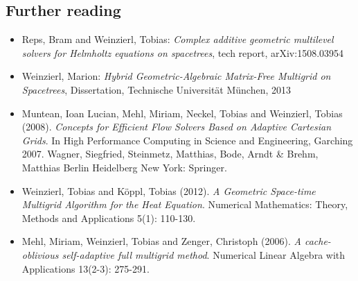 \subsection*{Further reading}

\begin{itemize}
  \item  Reps, Bram and Weinzierl, Tobias: {\em Complex additive geometric
  multilevel solvers for Helmholtz equations on spacetrees}, tech report,  
  arXiv:1508.03954
  \item Weinzierl, Marion: {\em Hybrid Geometric-Algebraic Matrix-Free Multigrid on
Spacetrees}, Dissertation, Technische Universit\"at M\"unchen, 2013
  \item   Muntean, Ioan Lucian, Mehl, Miriam, Neckel, Tobias and Weinzierl,
  Tobias (2008). {\em Concepts for Efficient Flow Solvers Based on Adaptive
  Cartesian Grids}. In High Performance Computing in Science and Engineering, Garching 2007. Wagner, Siegfried, Steinmetz, Matthias, Bode, Arndt & Brehm, Matthias Berlin Heidelberg New York: Springer.
  \item Weinzierl, Tobias and K\"oppl, Tobias (2012). {\em A Geometric
  Space-time Multigrid Algorithm for the Heat Equation}. Numerical Mathematics:
  Theory, Methods and Applications 5(1): 110-130.
  \item Mehl, Miriam, Weinzierl, Tobias and Zenger, Christoph (2006). {\em A
  cache-oblivious self-adaptive full multigrid method}. Numerical Linear Algebra
  with Applications 13(2-3): 275-291.
\end{itemize}
